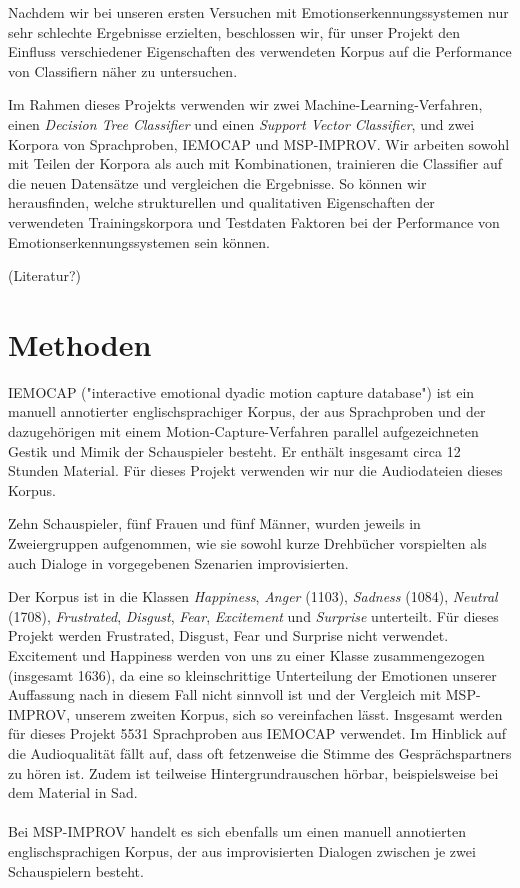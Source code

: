 \documentclass{article} %
\begin{document}
Nachdem wir bei unseren ersten Versuchen mit Emotionserkennungssystemen nur sehr schlechte Ergebnisse erzielten, beschlossen wir, für unser Projekt den Einfluss verschiedener Eigenschaften des verwendeten Korpus auf die Performance von Classifiern näher zu untersuchen. 

Im Rahmen dieses Projekts verwenden wir zwei Machine-Learning-Verfahren, einen \emph{Decision Tree Classifier} und einen \emph{Support Vector Classifier}, und zwei Korpora von Sprachproben, IEMOCAP\citep{iemocap} und MSP-IMPROV\cite{msp}. Wir arbeiten sowohl mit Teilen der Korpora als auch mit Kombinationen, trainieren die Classifier auf die neuen Datensätze und vergleichen die Ergebnisse. So können wir herausfinden, welche strukturellen und qualitativen Eigenschaften der verwendeten Trainingskorpora und Testdaten Faktoren bei der Performance von Emotionserkennungssystemen sein können. 

(Literatur?)
\section{Methoden}
IEMOCAP ("interactive emotional dyadic motion capture
database") ist ein manuell annotierter englischsprachiger Korpus, der aus Sprachproben und der dazugehörigen mit einem Motion-Capture-Verfahren parallel aufgezeichneten Gestik und Mimik der Schauspieler besteht. Er enthält insgesamt circa 12 Stunden Material. Für dieses Projekt verwenden wir nur die Audiodateien dieses Korpus. 

Zehn Schauspieler, fünf Frauen und fünf Männer, wurden jeweils in Zweiergruppen aufgenommen, wie sie sowohl kurze Drehbücher vorspielten als auch Dialoge in vorgegebenen Szenarien improvisierten. 

Der Korpus ist in die Klassen \emph{Happiness}, \emph{Anger} (1103), \emph{Sadness} (1084), \emph{Neutral} (1708), \emph{Frustrated}, \emph{Disgust}, \emph{Fear}, \emph{Excitement} und \emph{Surprise} unterteilt. Für dieses Projekt werden Frustrated, Disgust, Fear und Surprise nicht verwendet. Excitement und Happiness werden von uns zu einer Klasse zusammengezogen (insgesamt 1636), da eine so kleinschrittige Unterteilung der Emotionen unserer Auffassung nach in diesem Fall nicht sinnvoll ist und der Vergleich mit MSP-IMPROV, unserem zweiten Korpus, sich so vereinfachen lässt. Insgesamt werden für dieses Projekt 5531 Sprachproben aus IEMOCAP verwendet. 
Im Hinblick auf die Audioqualität fällt auf, dass oft fetzenweise die Stimme des Gesprächspartners zu hören ist. Zudem ist teilweise Hintergrundrauschen hörbar, beispielsweise bei dem Material in Sad. \\ \\
Bei MSP-IMPROV handelt es sich ebenfalls um einen manuell annotierten englischsprachigen Korpus, der aus improvisierten Dialogen zwischen je zwei Schauspielern besteht. 
\end{document}
